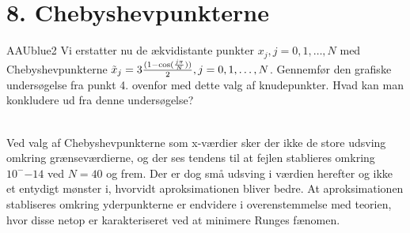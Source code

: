 \section*{8. Chebyshevpunkterne}
%
\begin{color}{AAUblue2} 
Vi erstatter nu de ækvidistante punkter $x_j , j = 0, 1, \ldots , N$ med Chebyshevpunkterne $\Tilde{x}_j = 3 \frac{(1 -\cos(\frac{j \pi}{N}))}{2}, j = 0, 1, \ldots , N$. 
Gennemfør den grafiske undersøgelse fra punkt 4. ovenfor med dette valg af knudepunkter. 
Hvad kan man konkludere ud fra denne undersøgelse?
\\
\end{color}
\\
%
Ved valg af Chebyshevpunkterne som x-værdier sker der ikke de store udsving omkring grænseværdierne, og der ses tendens til at fejlen stablieres omkring $10^-{-14}$ ved $N=40$ og frem. 
Der er dog små udsving i værdien herefter og ikke et entydigt mønster i, hvorvidt aproksimationen bliver bedre.
At aproksimationen stabliseres omkring yderpunkterne er endvidere i overenstemmelse med teorien, hvor disse netop er karakteriseret ved at minimere Runges fænomen.
